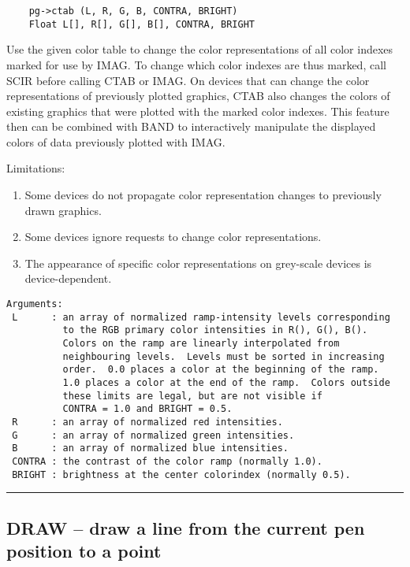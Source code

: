 \begin{verbatim}
    pg->ctab (L, R, G, B, CONTRA, BRIGHT)
    Float L[], R[], G[], B[], CONTRA, BRIGHT
\end{verbatim}

Use the given color table to change the color representations of all
color indexes marked for use by IMAG.  To change which color indexes
are thus marked, call SCIR before calling CTAB or IMAG.  On devices
that can change the color representations of previously plotted
graphics, CTAB also changes the colors of existing graphics that
were plotted with the marked color indexes.  This feature then can be
combined with BAND to interactively manipulate the displayed colors of
data previously plotted with IMAG.

Limitations:

\begin{enumerate}
\item Some devices do not propagate color representation changes to
      previously drawn graphics.  
\item Some devices ignore requests to change color representations.  
\item The appearance of specific color representations on grey-scale
      devices is device-dependent.  
\end{enumerate}

\begin{verbatim}
Arguments:
 L      : an array of normalized ramp-intensity levels corresponding
          to the RGB primary color intensities in R(), G(), B().
          Colors on the ramp are linearly interpolated from
          neighbouring levels.  Levels must be sorted in increasing
          order.  0.0 places a color at the beginning of the ramp.
          1.0 places a color at the end of the ramp.  Colors outside
          these limits are legal, but are not visible if
          CONTRA = 1.0 and BRIGHT = 0.5. 
 R      : an array of normalized red intensities.
 G      : an array of normalized green intensities.
 B      : an array of normalized blue intensities.
 CONTRA : the contrast of the color ramp (normally 1.0).
 BRIGHT : brightness at the center colorindex (normally 0.5).
\end{verbatim}

\hrule

\subsection*{DRAW -- draw a line from the current pen position to a point }

